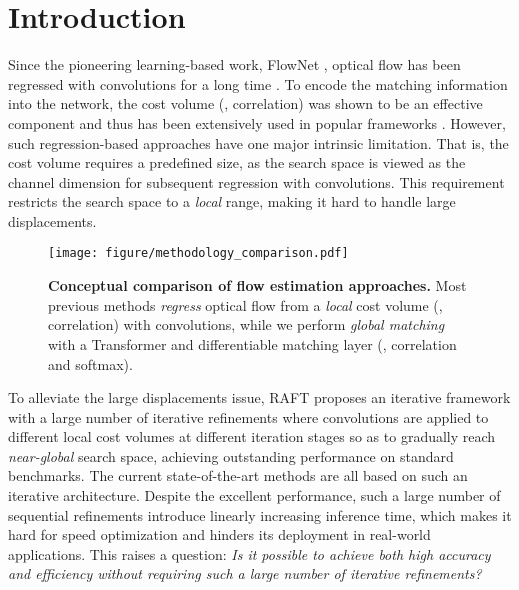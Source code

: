 \documentclass[10pt,twocolumn,letterpaper]{article}
\begin{document}
\vspace{-6pt}
\section{Introduction}
\label{sec:intro}
Since the pioneering learning-based work, FlowNet \cite{dosovitskiy2015flownet}, optical flow has been regressed with convolutions for a long time \cite{ilg2017flownet,ranjan2017optical,sun2018pwc,hur2019iterative,teed2020raft,xu2021high,Jiang_2021_ICCV,Zhang_2021_ICCV}. To encode the matching information into the network, the cost volume (\ie, correlation) \cite{hosni2012fast} was shown to be an effective component and thus has been extensively used in popular frameworks \cite{ilg2017flownet,sun2018pwc,teed2020raft}. However, such regression-based approaches have one major intrinsic limitation. That is, the cost volume requires a predefined size, as the search space is viewed as the channel dimension for subsequent regression with convolutions. This requirement restricts the search space to a \emph{local} range, making it hard to handle large displacements.




\begin{figure}[t]
    \centering
    \texttt{[image: figure/methodology\_comparison.pdf]}
    \vspace{-12pt}
    \caption{\textbf{Conceptual comparison of flow estimation approaches.} Most previous methods \emph{regress} optical flow from a \emph{local} cost volume (\ie, correlation) with convolutions, while we perform \emph{global matching} with a Transformer and differentiable matching layer (\ie, correlation and softmax).}
    \label{fig:flow_reg}
    \vspace{-12pt}
\end{figure}


To alleviate the large displacements issue, RAFT \cite{teed2020raft} proposes
an iterative framework with a large number of iterative refinements where convolutions are applied to different local cost volumes at different iteration stages so as to gradually reach \textit{near-global} search space, achieving outstanding performance on standard benchmarks. The current state-of-the-art methods \cite{Jiang_2021_ICCV, xu2021high, Zhang_2021_ICCV, teed2020raft} are all based on such an iterative architecture. Despite the excellent performance, such a large number of sequential refinements introduce linearly increasing inference time, which makes it hard for speed optimization and hinders its deployment in real-world applications. 
This raises a question: \textit{Is it possible to achieve both high accuracy and efficiency without requiring such a large number of iterative refinements?}
\end{document}

